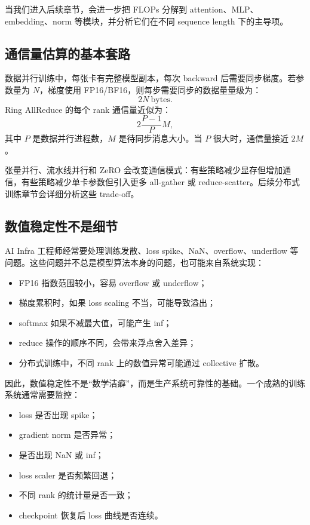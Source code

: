 当我们进入后续章节，会进一步把 FLOPs 分解到 attention、MLP、embedding、norm 等模块，并分析它们在不同 sequence length 下的主导项。

\subsection{通信量估算的基本套路}
\label{subsec:communication-estimation-basics}

数据并行训练中，每张卡有完整模型副本，每次 backward 后需要同步梯度。若参数量为 $N$，梯度使用 FP16/BF16，则每步需要同步的数据量量级为：
\[
  2N\ \mathrm{bytes}.
\]
Ring AllReduce 的每个 rank 通信量近似为：
\[
  2\frac{P-1}{P}M,
\]
其中 $P$ 是数据并行进程数，$M$ 是待同步消息大小。当 $P$ 很大时，通信量接近 $2M$。

张量并行、流水线并行和 ZeRO 会改变通信模式：有些策略减少显存但增加通信，有些策略减少单卡参数但引入更多 all-gather 或 reduce-scatter。后续分布式训练章节会详细分析这些 trade-off。

\subsection{数值稳定性不是细节}
\label{subsec:numerical-stability-is-not-detail}

AI Infra 工程师经常要处理训练发散、loss spike、NaN、overflow、underflow 等问题。这些问题并不总是模型算法本身的问题，也可能来自系统实现：

\begin{itemize}
  \item FP16 指数范围较小，容易 overflow 或 underflow；
  \item 梯度累积时，如果 loss scaling 不当，可能导致溢出；
  \item softmax 如果不减最大值，可能产生 inf；
  \item reduce 操作的顺序不同，会带来浮点舍入差异；
  \item 分布式训练中，不同 rank 上的数值异常可能通过 collective 扩散。
\end{itemize}

因此，数值稳定性不是“数学洁癖”，而是生产系统可靠性的基础。一个成熟的训练系统通常需要监控：

\begin{itemize}
  \item loss 是否出现 spike；
  \item gradient norm 是否异常；
  \item 是否出现 NaN 或 inf；
  \item loss scaler 是否频繁回退；
  \item 不同 rank 的统计量是否一致；
  \item checkpoint 恢复后 loss 曲线是否连续。
\end{itemize}


